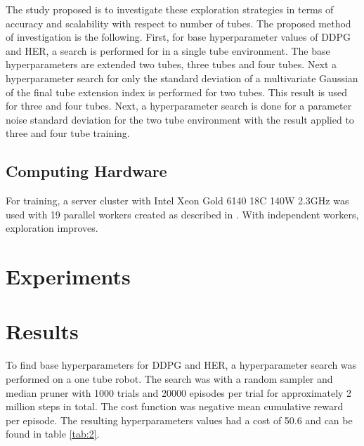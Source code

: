 The study proposed is to investigate these exploration strategies in terms of accuracy and scalability with respect to number of tubes. The proposed method of investigation is the following. First, for base hyperparameter values of DDPG and HER, a search is performed for in a single tube environment. The base hyperparameters are extended two tubes, three tubes and four tubes. Next a hyperparameter search for only the standard deviation of a multivariate Gaussian of the final tube extension index is performed for two tubes. This result is used for three and four tubes. Next, a hyperparameter search is done for a parameter noise standard deviation for the two tube environment with the result applied to three and four tube training. 

\subsection{Computing Hardware}
For training, a server cluster with Intel Xeon Gold 6140 18C 140W 2.3GHz was used with 19 parallel workers created as described in \cite{OpenAI2018}. With independent workers, exploration improves.

\section{Experiments}

\section{Results}
To find base hyperparameters for DDPG and HER, a hyperparameter search was performed on a one tube robot. The search was with a random sampler and median pruner with 1000 trials and 20000 episodes per trial for approximately 2 million steps in total. The cost function was negative mean cumulative reward per episode. The resulting hyperparameters values had a cost of 50.6 and can be found in table \ref{tab:2}.

